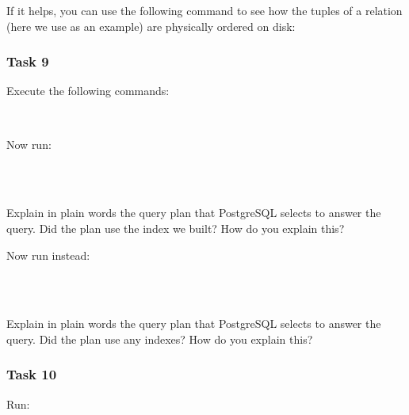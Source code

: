 \vgap

\noindent If it helps, you can use the following command to see how the tuples of a relation (here we use  as an example) are physically ordered on disk:

\vgap

\noindent {}

\subsubsection{Task 9}

Execute the following commands:

\vgap

\noindent {} \\
\noindent {}

\vgap

\noindent Now run:

\vgap

\noindent {} \\
 \\

\vgap

\noindent Explain in plain words the query plan that PostgreSQL selects to answer the query. Did the plan use the index  we built? How do you explain this?

\vgap

\noindent Now run instead:

\vgap

\noindent {} \\
 \\

\vgap

\noindent Explain in plain words the query plan that PostgreSQL selects to answer the query. Did the plan use any indexes? How do you explain this?

\subsubsection{Task 10}

\noindent Run:

